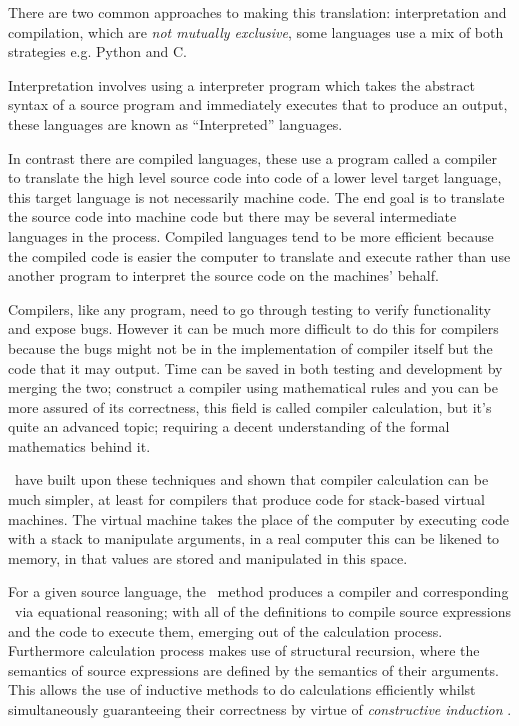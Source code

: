 \documentclass {article}
\begin{document}
There are two common approaches to making this translation:
interpretation and compilation, which are \emph{not mutually exclusive}, some languages use a mix of both 
strategies e.g. Python and C.

Interpretation involves using a
interpreter program which takes the abstract syntax of a
source program and immediately executes that to produce an output,
these languages are known as ``Interpreted'' languages.

In contrast there are compiled languages, these use 
a program called a compiler to translate the high level
source code into code of a lower level target language,
this target language is not necessarily machine code.
The end goal is to translate the source code into machine code
but there may be several intermediate languages in the process\cite[pg 8-10]{compilers}. Compiled languages tend to be more efficient
because the compiled code is easier the computer to translate
and execute rather than use another program to interpret
the source code on the machines' behalf.

Compilers, like any program, need to go through testing to
verify functionality and expose bugs. However it
can be much more difficult to do this for compilers
because the bugs might not be in the implementation of 
compiler itself but the code that it may output.
Time can be saved in both testing and development
by merging the two; construct a compiler
using mathematical rules and you can be more
assured of its correctness, this field is called
compiler calculation\cite{meijer}, 
but it's quite an
advanced topic; requiring a decent understanding 
of the formal mathematics behind it.

\BH\ have built upon these techniques and shown that
compiler calculation can be much simpler,
at least for compilers that produce code
for stack-based virtual machines.
The virtual machine takes the place of the
computer by executing code with a stack
to manipulate arguments, in a real computer
this can be likened to memory, in that
values are stored and manipulated in this space.

For a given source language, 
the \BH\ method produces
a compiler and corresponding \vm\
via equational reasoning;
with all of the definitions 
to compile source expressions
and the code to execute them,
emerging out of the calculation process.
Furthermore calculation process makes
use of structural recursion,
where the semantics of source expressions are defined
by the semantics of their arguments.
This allows the use of inductive methods
to do calculations efficiently
whilst simultaneously guaranteeing their correctness by virtue 
of \emph{constructive induction} \cite{backhouse}.
\end{document}
